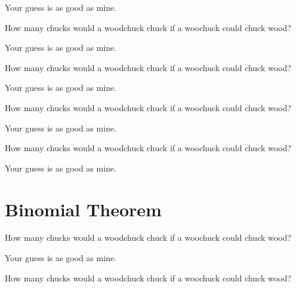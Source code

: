 \documentclass[12pt]{article}
\newenvironment{question}[2][Q]{\begin{trivlist}
\item[\hskip \labelsep {\bfseries #1}\hskip \labelsep {\bfseries #2.}]}{\end{trivlist}}
\newenvironment{answer}[2][A]{\begin{trivlist}
\item[\hskip \labelsep {\bfseries #1}\hskip \labelsep {\bfseries #2.}]}{\end{trivlist}}
\begin{document}
\begin{answer}{21}
Your guess is as good as mine.
\end{answer}
\begin{question}{22}
  How many chucks would a woodchuck chuck if a woochuck could chuck wood?
\end{question}

\begin{answer}{22}
Your guess is as good as mine.
\end{answer}
\begin{question}{23}
  How many chucks would a woodchuck chuck if a woochuck could chuck wood?
\end{question}

\begin{answer}{23}
Your guess is as good as mine.
\end{answer}
\begin{question}{24}
  How many chucks would a woodchuck chuck if a woochuck could chuck wood?
\end{question}

\begin{answer}{24}
Your guess is as good as mine.
\end{answer}
\begin{question}{25}
  How many chucks would a woodchuck chuck if a woochuck could chuck wood?
\end{question}

\begin{answer}{25}
Your guess is as good as mine.
\end{answer}

\section{Binomial Theorem}

\begin{question}{26}
  How many chucks would a woodchuck chuck if a woochuck could chuck wood?
\end{question}

\begin{answer}{26}
Your guess is as good as mine.
\end{answer}
\begin{question}{27}
  How many chucks would a woodchuck chuck if a woochuck could chuck wood?
\end{question}
\end{document}
